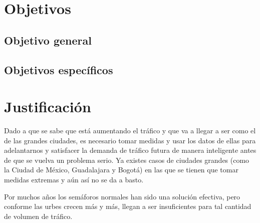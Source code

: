 \hypertarget{objetivos}{%
\section{Objetivos}\label{objetivos}}

\hypertarget{objetivo-general}{%
\subsection{Objetivo general}\label{objetivo-general}}

\hypertarget{objetivos-especuxedficos}{%
\subsection{Objetivos específicos}\label{objetivos-especuxedficos}}

\hypertarget{justificaciuxf3n}{%
\section{Justificación}\label{justificaciuxf3n}}

Dado a que se sabe que está aumentando el tráfico y que va a llegar a
ser como el de las grandes ciudades, es necesario tomar medidas y usar
los datos de ellas para adelantarnos y satisfacer la demanda de tráfico
futura de manera inteligente antes de que se vuelva un problema serio.
Ya existes casos de ciudades grandes (como la Ciudad de México,
Guadalajara y Bogotá) en las que se tienen que tomar medidas extremas y
aún así no se da a basto.

Por muchos años los semáforos normales han sido una solución efectiva,
pero conforme las urbes crecen más y más, llegan a ser insuficientes
para tal cantidad de volumen de tráfico.

\clearpage %
